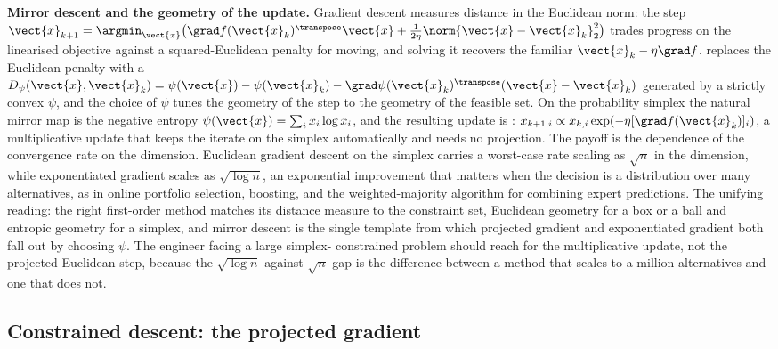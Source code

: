 \begin{mastery}
\textbf{Mirror descent and the geometry of the update.} Gradient
descent measures distance in the Euclidean norm: the step
$\vect{x}_{k+1} = \argmin_{\vect{x}} \big( \grad f(\vect{x}_{k})^{
\transpose} \vect{x} + \tfrac{1}{2\eta} \norm{\vect{x} -
\vect{x}_{k}}_{2}^{2} \big)$ trades progress on the linearised objective
against a squared-Euclidean penalty for moving, and solving it recovers
the familiar $\vect{x}_{k} - \eta \grad f$. 
replaces the Euclidean penalty with a 
$D_{\psi}(\vect{x}, \vect{x}_{k}) = \psi(\vect{x}) - \psi(\vect{x}_{k})
- \grad \psi(\vect{x}_{k})^{\transpose}(\vect{x} - \vect{x}_{k})$
generated by a strictly convex  $\psi$, and the
choice of $\psi$ tunes the geometry of the step to the geometry of the
feasible set. On the probability simplex the natural mirror map is the
negative entropy $\psi(\vect{x}) = \sum_{i} x_{i} \log x_{i}$, and the
resulting update is : $x_{k+1,i} \propto
x_{k,i} \exp(-\eta [\grad f(\vect{x}_{k})]_{i})$, a multiplicative
update that keeps the iterate on the simplex automatically and needs no
projection. The payoff is the dependence of the convergence rate on the
dimension. Euclidean gradient descent on the simplex carries a
worst-case rate scaling as $\sqrt{n}$ in the dimension, while
exponentiated gradient scales as $\sqrt{\log n}$, an exponential
improvement that matters when the decision is a distribution over many
alternatives, as in online portfolio selection, boosting, and the
weighted-majority algorithm for combining expert predictions. The
unifying reading: the right first-order method matches its distance
measure to the constraint set, Euclidean geometry for a box or a ball
and entropic geometry for a simplex, and mirror descent is the single
template from which projected gradient and exponentiated gradient both
fall out by choosing $\psi$. The engineer facing a large simplex-
constrained problem should reach for the multiplicative update, not the
projected Euclidean step, because the $\sqrt{\log n}$ against $\sqrt{n}$
gap is the difference between a method that scales to a million
alternatives and one that does not.
\end{mastery}

\subsection{Constrained descent: the projected gradient}

